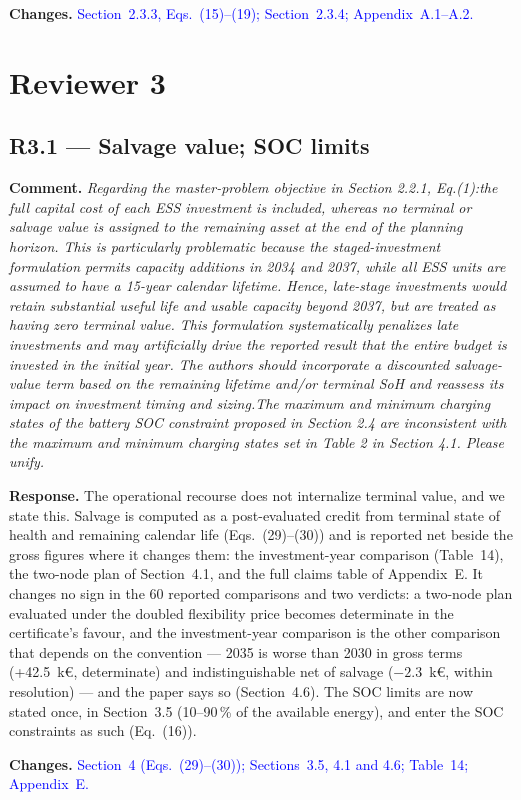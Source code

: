 \documentclass[11pt]{article}
\newcommand{\rcomment}[1]{\par\medskip\noindent\textbf{Comment.} \textit{#1}\par\smallskip}
\newcommand{\rresponse}[1]{\noindent\textbf{Response.} #1\par\smallskip}
\newcommand{\rchanges}[1]{\noindent\textbf{Changes.} \textcolor{blue}{#1}\par\medskip}
\begin{document}
\rchanges{
    Section~2.3.3, Eqs.~(15)--(19); Section~2.3.4; Appendix~A.1--A.2.
}

\section*{Reviewer 3}

\subsection*{R3.1 --- Salvage value; SOC limits}
\rcomment{
Regarding the master-problem objective in Section 2.2.1, Eq.(1):the full capital cost of each ESS investment is included, whereas no terminal or salvage value is assigned to the remaining asset at the end of the planning horizon. This is particularly problematic because the staged-investment formulation permits capacity additions in 2034 and 2037, while all ESS units are assumed to have a 15-year calendar lifetime. Hence, late-stage investments would retain substantial useful life and usable capacity beyond 2037, but are treated as having zero terminal value. This formulation systematically penalizes late investments and may artificially drive the reported result that the entire budget is invested in the initial year. The authors should incorporate a discounted salvage-value term based on the remaining lifetime and/or terminal SoH and reassess its impact on investment timing and sizing.The maximum and minimum charging states of the battery SOC constraint proposed in Section 2.4 are inconsistent with the maximum and minimum charging states set in Table 2 in Section 4.1. Please unify.
}
\rresponse{The operational recourse does not internalize terminal value, and we state this. Salvage is computed as a post-evaluated credit from terminal state of health and remaining calendar life (Eqs.~(29)--(30)) and is reported net beside the gross figures where it changes them: the investment-year comparison (Table~14), the two-node plan of Section~4.1, and the full claims table of Appendix~E. 
It changes no sign in the 60 reported comparisons and two verdicts: a two-node plan evaluated under the doubled flexibility price becomes determinate in the certificate's favour, and the investment-year comparison is the other comparison that depends on the convention --- 2035 is worse than 2030 in gross terms (+42.5~k\euro{}, determinate) and indistinguishable net of salvage ($-2.3$~k\euro{}, within resolution) --- and the paper says so (Section~4.6). The SOC limits are now stated once, in Section~3.5 (10--90\,\% of the available energy), and enter the SOC constraints as such (Eq.~(16)).}
\rchanges{Section~4 (Eqs.~(29)--(30)); Sections~3.5, 4.1 and 4.6; Table~14; Appendix~E.}
\end{document}
